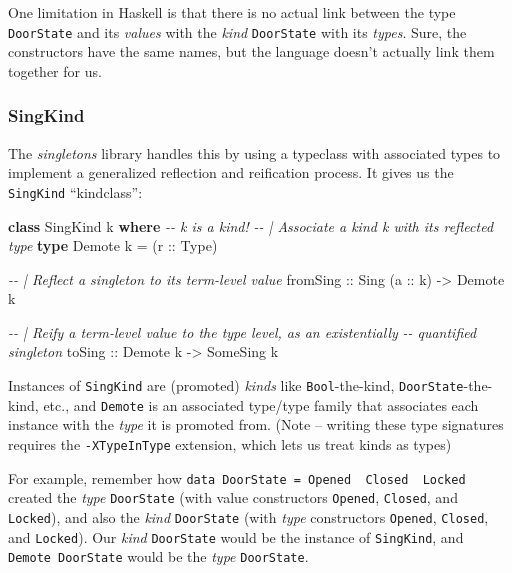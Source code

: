 \documentclass[]{article}
\newenvironment{Shaded}{}{}
\newcommand{\CommentTok}[1]{\textcolor[rgb]{0.38,0.63,0.69}{\textit{#1}}}
\newcommand{\DataTypeTok}[1]{\textcolor[rgb]{0.56,0.13,0.00}{#1}}
\newcommand{\KeywordTok}[1]{\textcolor[rgb]{0.00,0.44,0.13}{\textbf{#1}}}
\newcommand{\NormalTok}[1]{#1}
\newcommand{\OtherTok}[1]{\textcolor[rgb]{0.00,0.44,0.13}{#1}}
\begin{document}
One limitation in Haskell is that there is no actual link between the type
\texttt{DoorState} and its \emph{values} with the \emph{kind} \texttt{DoorState}
with its \emph{types}. Sure, the constructors have the same names, but the
language doesn't actually link them together for us.

\subsubsection{SingKind}\label{singkind}

The \emph{singletons} library handles this by using a typeclass with associated
types to implement a generalized reflection and reification process. It gives us
the \texttt{SingKind} ``kindclass'':

\begin{Shaded}
\begin{Highlighting}[]
\KeywordTok{class} \DataTypeTok{SingKind}\NormalTok{ k }\KeywordTok{where}      \CommentTok{{-}{-} \textasciigrave{}k\textasciigrave{} is a kind!}
    \CommentTok{{-}{-} | Associate a kind k with its reflected type}
    \KeywordTok{type} \DataTypeTok{Demote}\NormalTok{ k }\OtherTok{=}\NormalTok{ (}\OtherTok{r ::} \DataTypeTok{Type}\NormalTok{)}

    \CommentTok{{-}{-} | Reflect a singleton to its term{-}level value}
\OtherTok{    fromSing ::} \DataTypeTok{Sing}\NormalTok{ (}\OtherTok{a ::}\NormalTok{ k) }\OtherTok{{-}\textgreater{}} \DataTypeTok{Demote}\NormalTok{ k}

    \CommentTok{{-}{-} | Reify a term{-}level value to the type level, as an existentially}
    \CommentTok{{-}{-} quantified singleton}
\OtherTok{    toSing ::} \DataTypeTok{Demote}\NormalTok{ k }\OtherTok{{-}\textgreater{}} \DataTypeTok{SomeSing}\NormalTok{ k}
\end{Highlighting}
\end{Shaded}

Instances of \texttt{SingKind} are (promoted) \emph{kinds} like
\texttt{Bool}-the-kind, \texttt{DoorState}-the-kind, etc., and \texttt{Demote}
is an associated type/type family that associates each instance with the
\emph{type} it is promoted from. (Note -- writing these type signatures requires
the \texttt{-XTypeInType} extension, which lets us treat kinds as types)

For example, remember how
\texttt{data\ DoorState\ =\ Opened\ \textbar{}\ Closed\ \textbar{}\ Locked}
created the \emph{type} \texttt{DoorState} (with value constructors
\texttt{Opened}, \texttt{Closed}, and \texttt{Locked}), and also the \emph{kind}
\texttt{DoorState} (with \emph{type} constructors
\texttt{\textquotesingle{}Opened}, \texttt{\textquotesingle{}Closed}, and
\texttt{\textquotesingle{}Locked}). Our \emph{kind} \texttt{DoorState} would be
the instance of \texttt{SingKind}, and \texttt{Demote\ DoorState} would be the
\emph{type} \texttt{DoorState}.
\end{document}
